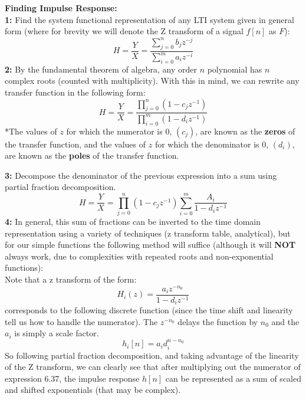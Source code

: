 \documentclass[a4paper]{article}
\numberwithin{equation}{section}
\begin{document}
\textbf{Finding Impulse Response:}\\

\textbf{1:}  Find the system functional representation of any LTI system given in general form (where for brevity we will denote the Z transform of a signal $f[n]$ as $F$):
\begin{equation}
H=\frac{Y}{X}=\frac{\sum_{j=0}^{n} b_j z^{-j}}{\sum_{i=0}^{m} a_i z^{-i}}
\end{equation}
\textbf{2:}  By the fundamental theorem of algebra, any order $n$ polynomial has $n$ complex roots (counted with multiplicity). With this in mind, we can rewrite any transfer function in the following form:
\begin{equation}
H=\frac{Y}{X}=\frac{\prod_{j=0}^{n} (1-c_j z^{-1})}{\prod_{i=0}^{m}(1-d_i z^{-1})}
\end{equation}
*The values of $z$ for which the numerator is 0, $(c_j)$, are known as the \textbf{zeros} of the transfer function, and the values of $z$ for which the denominator is 0, $(d_i)$, are known as the \textbf{poles} of the transfer function. 

\textbf{3:}  Decompose the denominator of the previous expression into a sum using partial fraction decomposition.
\begin{equation}
H=\frac{Y}{X}=\prod_{j=0}^{n} (1-c_j z^{-1})\sum_{i=0}^{m}\frac{A_i}{1-d_i z^{-1}}
\end{equation}
\textbf{4:}  In general, this sum of fractions can be inverted to the time domain representation using a variety of techniques (z transform table, analytical), but for our simple functions the following method will suffice (although it will \textbf{NOT} always work, due to complexities with repeated roots and non-exponential functions):\\

Note that a z transform of the form:
\begin{equation}
H_i(z)=\frac{a_i z^{-n_0}}{1-d_i z^{-1}}
\end{equation}
corresponds to the following discrete function (since the time shift and linearity tell us how to handle the numerator). The $z^{-n_0}$ delays the function by $n_0$ and the $a_i$ is simply a scale factor.
\begin{equation}
h_i[n] = a_i d_i^{n-n_0}
\end{equation}
So following partial fraction decomposition, and taking advantage of the linearity of the Z transform, we can clearly see that after multiplying out the numerator of expression 6.37, the impulse response $h[n]$ can be represented as a sum of scaled and shifted exponentials (that may be complex).
\end{document}
